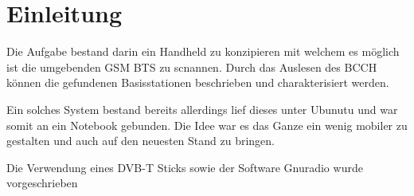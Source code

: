 %
%
\chapter{Einleitung}
Die Aufgabe bestand darin ein Handheld zu konzipieren mit welchem es möglich ist die umgebenden \ac{GSM} \ac{BTS} zu scnannen. Durch das Auslesen des \ac{BCCH} können die gefundenen Basisstationen beschrieben und charakterisiert werden.

Ein solches System bestand bereits allerdings lief dieses unter Ubunutu und war somit an ein Notebook gebunden. Die Idee war es das Ganze ein wenig mobiler zu gestalten und auch auf den neuesten Stand zu bringen. 

Die Verwendung eines DVB-T Sticks sowie der Software Gnuradio wurde vorgeschrieben 
